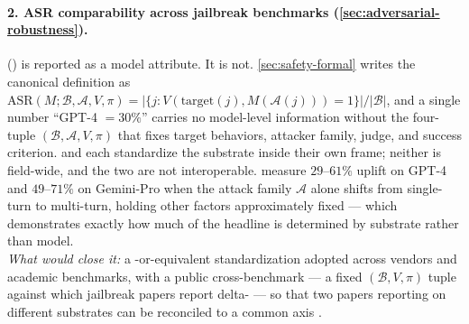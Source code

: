 \paragraph{2. ASR comparability across jailbreak benchmarks (\cref{sec:adversarial-robustness}).}
 () is reported as a model attribute. It is
not. \cref{sec:safety-formal} writes the canonical definition as
$\mathrm{ASR}(M;\mathcal{B}, \mathcal{A}, V, \pi) = |\{j:
V(\mathrm{target}(j), M(\mathcal{A}(j))) = 1\}| / |\mathcal{B}|$,
and a single number ``GPT-4  $= 30\%$'' carries no model-level
information without the four-tuple
$(\mathcal{B}, \mathcal{A}, V, \pi)$ that fixes target behaviors,
attacker family, judge, and success criterion. \citet{harmbench2024}
and \citet{chao2024-jailbreakbench} each standardize the substrate
inside their own frame; neither is field-wide, and the two are not
interoperable. \citet{russinovich2024-crescendo} measure
$29$--$61\%$  uplift on GPT-4 and $49$--$71\%$ on Gemini-Pro
when the attack family $\mathcal{A}$ alone
shifts from single-turn to multi-turn, holding other factors
approximately fixed --- which demonstrates exactly how much of the
headline  is determined by substrate rather than model.\\
\emph{What would close it:} a -or-equivalent
standardization adopted across vendors and academic benchmarks,
with a public cross-benchmark  --- a fixed
$(\mathcal{B}, V, \pi)$ tuple against which jailbreak papers report
delta- --- so that two papers reporting  on different
substrates can be reconciled to a common axis
\citep{harmbench2024, chao2024-jailbreakbench, wei2023-jailbroken,
russinovich2024-crescendo}.

